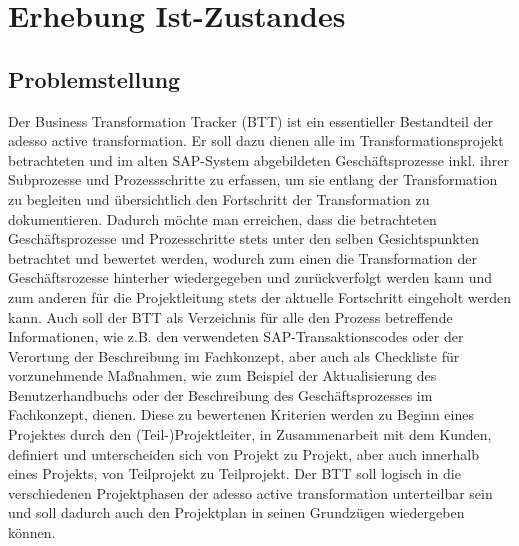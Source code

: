 \section{Erhebung Ist-Zustandes}
\label{kap:istzustand}
\subsection{Problemstellung}
Der Business Transformation Tracker (BTT) ist ein essentieller Bestandteil der adesso active transformation. Er soll dazu dienen alle im Transformationsprojekt betrachteten und im alten SAP-System abgebildeten Geschäftsprozesse inkl. ihrer Subprozesse und Prozessschritte zu erfassen, um sie entlang der Transformation zu begleiten und übersichtlich den Fortschritt der Transformation zu dokumentieren. Dadurch möchte man erreichen, dass die betrachteten Geschäftsprozesse und Prozesschritte stets unter den selben Gesichtspunkten betrachtet und bewertet werden, wodurch zum einen die Transformation der Geschäftsrozesse hinterher wiedergegeben und zurückverfolgt werden kann und zum anderen für die Projektleitung stets der aktuelle Fortschritt eingeholt werden kann. Auch soll der BTT als Verzeichnis für alle den Prozess betreffende Informationen, wie z.B. den verwendeten SAP-Transaktionscodes oder der Verortung der Beschreibung im Fachkonzept, aber auch als Checkliste für vorzunehmende Maßnahmen, wie zum Beispiel der Aktualisierung des Benutzerhandbuchs oder der Beschreibung des Geschäftsprozesses im Fachkonzept, dienen. Diese zu bewertenen Kriterien werden zu Beginn eines Projektes durch den (Teil-)Projektleiter, in Zusammenarbeit mit dem Kunden, definiert und unterscheiden sich von Projekt zu Projekt, aber auch innerhalb eines Projekts, von Teilprojekt zu Teilprojekt. Der BTT soll logisch in die verschiedenen Projektphasen der adesso active transformation unterteilbar sein und soll dadurch auch den Projektplan in seinen Grundzügen wiedergeben können.


